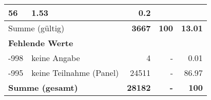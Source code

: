 \begin{longtable}{lXrrr}
       \num{56} &
       \num[round-mode=places,round-precision=2]{1.53} &
         \num[round-mode=places,round-precision=2]{0.2} \\
     \midrule
     \multicolumn{2}{l}{Summe (gültig)} &
       \textbf{\num{3667}} &
     \textbf{\num{100}} &
       \textbf{\num[round-mode=places,round-precision=2]{13.01}} \\
     \multicolumn{5}{l}{\textbf{Fehlende Werte}}\\
       -998 &
       keine Angabe &
         \num{4} &
        - &
         \num[round-mode=places,round-precision=2]{0.01} \\
       -995 &
       keine Teilnahme (Panel) &
         \num{24511} &
        - &
         \num[round-mode=places,round-precision=2]{86.97} \\
     \midrule
     \multicolumn{2}{l}{\textbf{Summe (gesamt)}} &
          \textbf{\num{28182}} &
        \textbf{-} &
        \textbf{\num{100}} \\
     \bottomrule
     \end{longtable}
     
